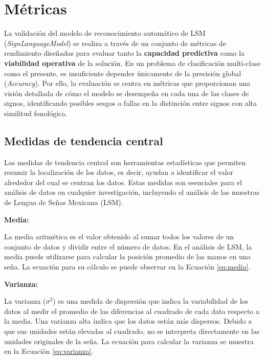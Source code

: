 \section{Métricas}
La validación del modelo de reconocimiento automático de LSM (\textit{SignLanguageModel}) se realiza a través de un conjunto de métricas de rendimiento diseñadas para evaluar tanto la \textbf{capacidad predictiva} como la \textbf{viabilidad operativa} de la solución. En un problema de clasificación multi-clase como el presente, es insuficiente depender únicamente de la precisión global (\textit{Accuracy}). Por ello, la evaluación se centra en métricas que proporcionan una visión detallada de cómo el modelo se desempeña en cada una de las clases de signos, identificando posibles sesgos o fallas en la distinción entre signos con alta similitud fonológica.

\subsection{Medidas de tendencia central}

Las medidas de tendencia central son herramientas estadísticas que permiten resumir la localización de los datos, es decir, ayudan a identificar el valor alrededor del cual se centran los datos. Estas medidas son esenciales para el análisis de datos en cualquier investigación, incluyendo el análisis de las muestras de Lengua de Señas Mexicana (LSM).



\textbf{Media:}

La media aritmética es el valor obtenido al sumar todos los valores de un conjunto de datos y dividir entre el número de datos. En el análisis de LSM, la media puede utilizarse para calcular la posición promedio de las manos en una seña. La ecuación para su cálculo se puede observar en la Ecuación \ref{eq:media}.



\textbf{Varianza:}

La varianza ($\sigma^2$) es una medida de dispersión que indica la variabilidad de los datos al medir el promedio de las diferencias al cuadrado de cada dato respecto a la media. Una varianza alta indica que los datos están más dispersos. Debido a que sus unidades están elevadas al cuadrado, no se interpreta directamente en las unidades originales de la seña. La ecuación para calcular la varianza se muestra en la Ecuación \ref{eq:varianza}.

